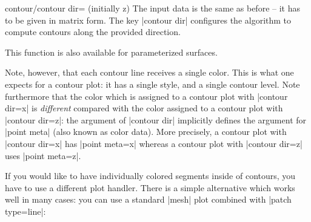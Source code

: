 {{\begin{pgfplotskey}{contour/contour dir= (initially z)}
	The input data is the same as before -- it has to be given in matrix form. The key |contour dir| configures the algorithm to compute contours along the provided direction.

\pgfplotsexpensiveexample
\begin{codeexample}[]
\end{codeexample}

	This function is also available for parameterized surfaces.

\pgfplotsexpensiveexample
\begin{codeexample}[]
\end{codeexample}

	Note, however, that each contour line receives a single color. This is what one expects for a contour plot: it has a single style, and a single contour level. Note furthermore that the color which is assigned to a contour plot with |contour dir=x| is \emph{different} compared with the color assigned to a contour plot with |contour dir=z|: the argument of |contour dir| implicitly defines the argument for |point meta| (also known as color data). More precisely, a contour plot with |contour dir=x| has |point meta=x| whereas a contour plot with |contour dir=z| uses |point meta=z|.

	If you would like to have individually colored segments inside of contours, you have to use a different plot handler. There is a simple alternative which works well in many cases: you can use a standard |mesh| plot combined with |patch type=line|:

\pgfplotsexpensiveexample
\begin{codeexample}[]
\end{codeexample}
	

\end{pgfplotskey}}}
